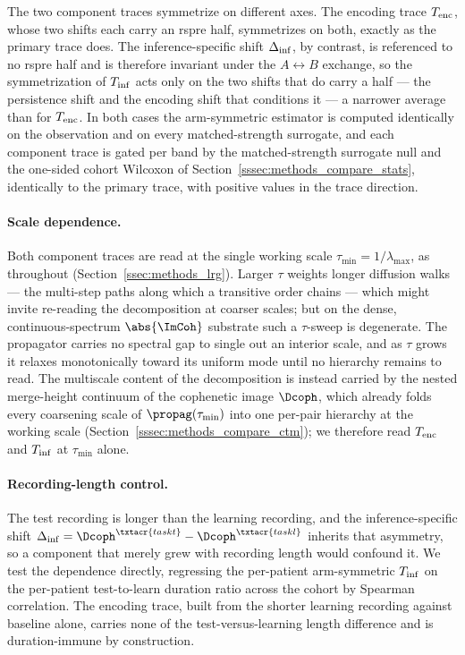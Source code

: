 The two component traces symmetrize on different axes. The encoding trace \(T_{\rm enc}\), whose two shifts each carry an \acrshort{rspre} half, symmetrizes on both, exactly as the primary trace does. The inference-specific shift \(\Delta_{\rm inf}\), by contrast, is referenced to no \acrshort{rspre} half and is therefore invariant under the \(A\!\leftrightarrow\!B\) exchange, so the symmetrization of \(T_{\rm inf}\) acts only on the two shifts that do carry a half --- the persistence shift and the encoding shift that conditions it --- a narrower average than for \(T_{\rm enc}\). In both cases the arm-symmetric estimator is computed identically on the observation and on every matched-strength surrogate, and each component trace is gated per band by the matched-strength surrogate null and the one-sided cohort Wilcoxon of Section~\ref{sssec:methods_compare_stats}, identically to the primary trace, with positive values in the trace direction.

\paragraph{Scale dependence.}
Both component traces are read at the single working scale \(\tau_{\min} = 1/\lambda_{\max}\), as throughout (Section~\ref{ssec:methods_lrg}). Larger \(\tau\) weights longer diffusion walks --- the multi-step paths along which a transitive order chains --- which might invite re-reading the decomposition at coarser scales; but on the dense, continuous-spectrum \(\abs{\ImCoh}\) substrate such a \(\tau\)-sweep is degenerate. The propagator carries no spectral gap to single out an interior scale, and as \(\tau\) grows it relaxes monotonically toward its uniform mode until no hierarchy remains to read. The multiscale content of the decomposition is instead carried by the nested merge-height continuum of the cophenetic image \(\Dcoph\), which already folds every coarsening scale of \(\propag(\tau_{\min})\) into one per-pair hierarchy at the working scale (Section~\ref{sssec:methods_compare_ctm}); we therefore read \(T_{\rm enc}\) and \(T_{\rm inf}\) at \(\tau_{\min}\) alone.

\paragraph{Recording-length control.}
The test recording is longer than the learning recording, and the inference-specific shift \(\Delta_{\rm inf} = \Dcoph^{\txtacr{taskt}} - \Dcoph^{\txtacr{taskl}}\) inherits that asymmetry, so a component that merely grew with recording length would confound it. We test the dependence directly, regressing the per-patient arm-symmetric \(T_{\rm inf}\) on the per-patient test-to-learn duration ratio across the cohort by Spearman correlation. The encoding trace, built from the shorter learning recording against baseline alone, carries none of the test-versus-learning length difference and is duration-immune by construction.
